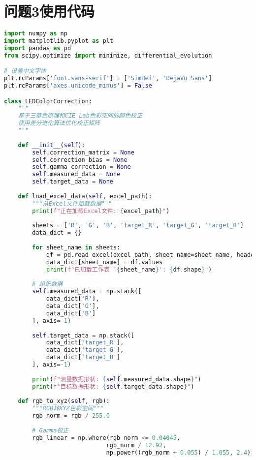 \section[\hspace{-2pt}问题3使用代码]{{\heiti{} \hspace{-8pt}问题3使用代码}}
\begin{lstlisting}[language=Python]
import numpy as np
import matplotlib.pyplot as plt
import pandas as pd
from scipy.optimize import minimize, differential_evolution

# 设置中文字体
plt.rcParams['font.sans-serif'] = ['SimHei', 'DejaVu Sans']
plt.rcParams['axes.unicode_minus'] = False

class LEDColorCorrection:
    """
    基于三基色原理和CIE Lab色彩空间的颜色校正
    使用差分进化算法优化校正矩阵
    """
    
    def __init__(self):
        self.correction_matrix = None
        self.correction_bias = None
        self.gamma_correction = None
        self.measured_data = None
        self.target_data = None
        
    def load_excel_data(self, excel_path):
        """从Excel文件加载数据"""
        print(f"正在加载Excel文件: {excel_path}")
        
        sheets = ['R', 'G', 'B', 'target_R', 'target_G', 'target_B']
        data_dict = {}
        
        for sheet_name in sheets:
            df = pd.read_excel(excel_path, sheet_name=sheet_name, header=None).iloc[0:64,0:64]
            data_dict[sheet_name] = df.values
            print(f"已加载工作表 '{sheet_name}': {df.shape}")
        
        # 组织数据
        self.measured_data = np.stack([
            data_dict['R'],
            data_dict['G'], 
            data_dict['B']
        ], axis=-1)
        
        self.target_data = np.stack([
            data_dict['target_R'],
            data_dict['target_G'],
            data_dict['target_B']
        ], axis=-1)
        
        print(f"测量数据形状: {self.measured_data.shape}")
        print(f"目标数据形状: {self.target_data.shape}")
    
    def rgb_to_xyz(self, rgb):
        """RGB转XYZ色彩空间"""
        rgb_norm = rgb / 255.0
        
        # Gamma校正
        rgb_linear = np.where(rgb_norm <= 0.04045,
                             rgb_norm / 12.92,
                             np.power((rgb_norm + 0.055) / 1.055, 2.4))
        

\end{lstlisting}
